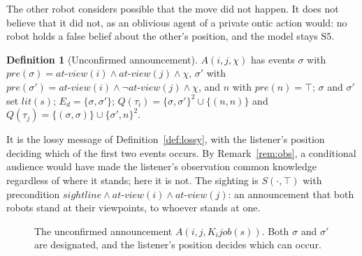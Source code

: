 \documentclass[11pt,a4paper]{article}
\theoremstyle{definition}
\newtheorem{definition}{Definition}
\newcommand{\Kop}[1]{K_{#1}}
\newcommand{\job}{\mathit{job}}
\newcommand{\pre}{\mathit{pre}}
\newcommand{\atview}{\mathit{at\text{-}view}}
\begin{document}
The other robot considers possible that the move did not happen. It does not
believe that it did not, as an oblivious agent of a private ontic action would:
no robot holds a false belief about the other's position, and the model stays
$\mathrm{S5}$.

\begin{definition}[Unconfirmed announcement]
$A(i,j,\chi)$ has events $\sigma$ with
$\pre(\sigma) = \atview(i) \wedge \atview(j) \wedge \chi$, $\sigma'$ with
$\pre(\sigma') = \atview(i) \wedge \neg\atview(j) \wedge \chi$, and $n$ with
$\pre(n) = \top$; $\sigma$ and $\sigma'$ set $\mathit{lit}(s)$;
$E_d = \{\sigma, \sigma'\}$; $Q(\tau_i) = \{\sigma,\sigma'\}^2 \cup \{(n,n)\}$
and $Q(\tau_j) = \{(\sigma,\sigma)\} \cup \{\sigma', n\}^2$.
\end{definition}

It is the lossy message of Definition~\ref{def:lossy}, with the listener's
position deciding which of the first two events occurs. By
Remark~\ref{rem:obs}, a conditional audience would have made the listener's
observation common knowledge regardless of where it stands; here it is not. The
sighting is $S(\cdot,\top)$ with precondition $\mathit{sightline} \wedge
\atview(i) \wedge \atview(j)$: an announcement that both robots stand at their
viewpoints, to whoever stands at one.

\begin{figure}[H]
\centering
{}
\caption{The unconfirmed announcement $A(i,j,\Kop{i}\job(s))$. Both $\sigma$ and
$\sigma'$ are designated, and the listener's position decides which can occur.}
\label{fig:unconfirmed}
\end{figure}
\end{document}
